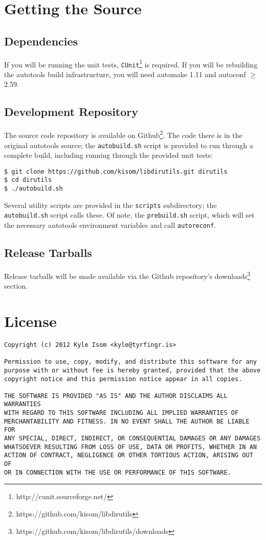 \documentclass[10pt,letterpaper]{article}
\begin{document}
\section*{Getting the Source}
\subsection*{Dependencies}
If you will be running the unit tests, \verb|CUnit|\footnote{http://cunit.sourceforge.net/}
is required. If you will be rebuilding the autotools build infrastructure,
you will need automake 1.11 and autoconf $\geq$ 2.59.
\subsection*{Development Repository}
The source code repository is available on Github\footnote{https://github.com/kisom/libdirutils}.
The code there is in the original autotools source; the \verb|autobuild.sh|
script is provided to run through a complete build, including running through
the provided unit tests:

\begin{verbatim}
$ git clone https://github.com/kisom/libdirutils.git dirutils
$ cd dirutils
$ ./autobuild.sh
\end{verbatim}

Several utility scripts are provided in the \verb|scripts| subdirectory;
the \verb|autobuild.sh| script calls these. Of note, the \verb|prebuild.sh|
script, which will set the necessary autotools environment variables and call
\verb|autoreconf|.
\subsection*{Release Tarballs}
Release tarballs will be made available via the Github repository's
downloads\footnote{https://github.com/kisom/libdirutils/downloads} section.
\section*{License}
\begin{verbatim}
Copyright (c) 2012 Kyle Isom <kyle@tyrfingr.is>

Permission to use, copy, modify, and distribute this software for any
purpose with or without fee is hereby granted, provided that the above 
copyright notice and this permission notice appear in all copies.

THE SOFTWARE IS PROVIDED "AS IS" AND THE AUTHOR DISCLAIMS ALL WARRANTIES
WITH REGARD TO THIS SOFTWARE INCLUDING ALL IMPLIED WARRANTIES OF
MERCHANTABILITY AND FITNESS. IN NO EVENT SHALL THE AUTHOR BE LIABLE FOR
ANY SPECIAL, DIRECT, INDIRECT, OR CONSEQUENTIAL DAMAGES OR ANY DAMAGES
WHATSOEVER RESULTING FROM LOSS OF USE, DATA OR PROFITS, WHETHER IN AN
ACTION OF CONTRACT, NEGLIGENCE OR OTHER TORTIOUS ACTION, ARISING OUT OF
OR IN CONNECTION WITH THE USE OR PERFORMANCE OF THIS SOFTWARE. 
\end{verbatim}
\end{document}
